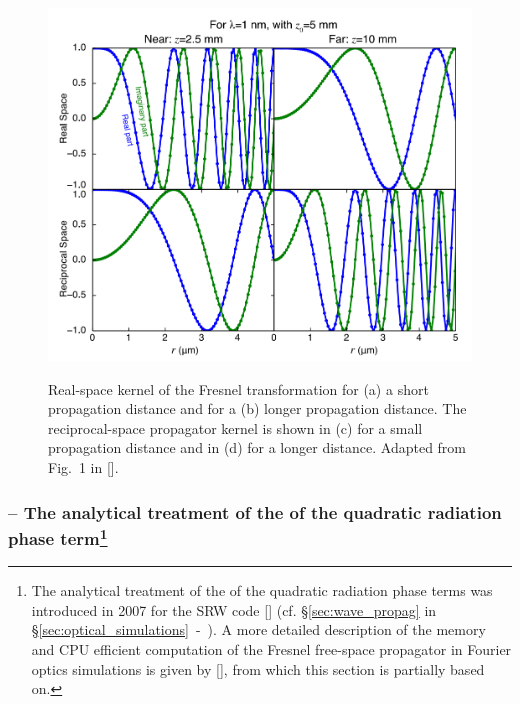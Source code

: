 \begin{refsection}
\begin{figure}[t]
    \centering
    {\includegraphics[width=0.5\linewidth]{figures/ch02/real_reciprocal.png}}
    \caption[Frensel transformation kernel in real and reciprocal space]{Real-space kernel of the Fresnel transformation for (a) a short propagation distance and for a (b) longer propagation distance. The reciprocal-space propagator kernel is shown in (c) for a small propagation distance and in (d) for a longer distance. Adapted from Fig.~1 in [\cite{Li2015}].}
    \label{fig:real_reciprocal}
\end{figure}
\subsubsection*{\normalsize -- The analytical treatment of the of the quadratic radiation phase term\footnote{The analytical treatment of the of the quadratic radiation phase terms was introduced in 2007 for the SRW code [\cite{Chubar2008}] (cf. §\ref{sec:wave_propag} in §\ref{sec:optical_simulations}~-~\textit{}). A more detailed description of the memory and CPU efficient computation of the Fresnel free-space propagator in Fourier optics simulations is given by [\cite{Chubar2019}], from which this section is partially based on.}}


\end{refsection}

